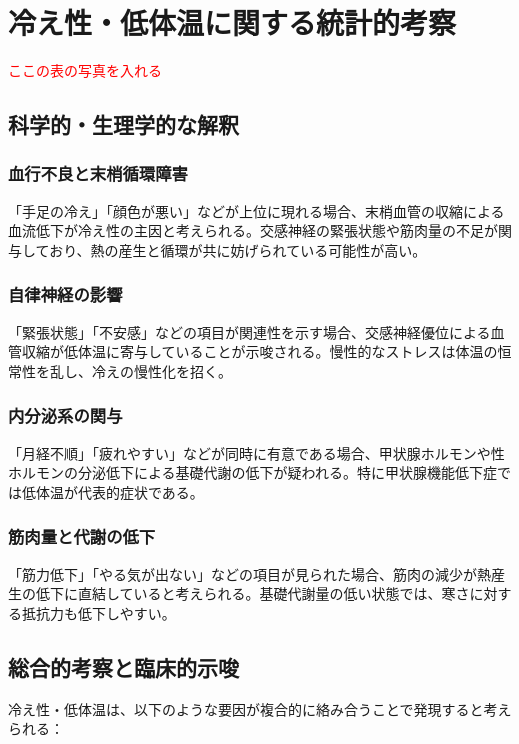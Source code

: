 \documentclass[a4paper,12pt]{article}
\begin{document}
\section{冷え性・低体温に関する統計的考察}

\textcolor{red}{ここの表の写真を入れる}
\subsection*{科学的・生理学的な解釈}

\subsubsection*{血行不良と末梢循環障害}

「手足の冷え」「顔色が悪い」などが上位に現れる場合、末梢血管の収縮による血流低下が冷え性の主因と考えられる。交感神経の緊張状態や筋肉量の不足が関与しており、熱の産生と循環が共に妨げられている可能性が高い。

\subsubsection*{自律神経の影響}

「緊張状態」「不安感」などの項目が関連性を示す場合、交感神経優位による血管収縮が低体温に寄与していることが示唆される。慢性的なストレスは体温の恒常性を乱し、冷えの慢性化を招く。

\subsubsection*{内分泌系の関与}

「月経不順」「疲れやすい」などが同時に有意である場合、甲状腺ホルモンや性ホルモンの分泌低下による基礎代謝の低下が疑われる。特に甲状腺機能低下症では低体温が代表的症状である。

\subsubsection*{筋肉量と代謝の低下}

「筋力低下」「やる気が出ない」などの項目が見られた場合、筋肉の減少が熱産生の低下に直結していると考えられる。基礎代謝量の低い状態では、寒さに対する抵抗力も低下しやすい。

\subsection*{総合的考察と臨床的示唆}

冷え性・低体温は、以下のような要因が複合的に絡み合うことで発現すると考えられる：
\end{document}
